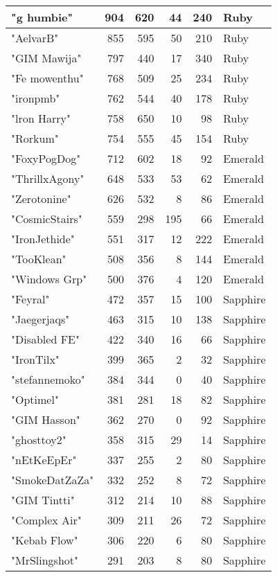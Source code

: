 \documentclass{article}
\begin{document}
\begin{table}[htbp]
\begin{tabular}{|l|r|r|r|r|l|}
"g humbie" & 904 & 620 & 44 & 240 & Ruby \\ \hline
"AelvarB" & 855 & 595 & 50 & 210 & Ruby \\ \hline
"GIM Mawija" & 797 & 440 & 17 & 340 & Ruby \\ \hline
"Fe mowenthu" & 768 & 509 & 25 & 234 & Ruby \\ \hline
"ironpmb" & 762 & 544 & 40 & 178 & Ruby \\ \hline
"lron Harry" & 758 & 650 & 10 & 98 & Ruby \\ \hline
"Rorkum" & 754 & 555 & 45 & 154 & Ruby \\ \hline
"FoxyPogDog" & 712 & 602 & 18 & 92 & Emerald \\ \hline
"ThrillxAgony" & 648 & 533 & 53 & 62 & Emerald \\ \hline
"Zerotonine" & 626 & 532 & 8 & 86 & Emerald \\ \hline
"CosmicStairs" & 559 & 298 & 195 & 66 & Emerald \\ \hline
"IronJethide" & 551 & 317 & 12 & 222 & Emerald \\ \hline
"TooKlean" & 508 & 356 & 8 & 144 & Emerald \\ \hline
"Windows Grp" & 500 & 376 & 4 & 120 & Emerald \\ \hline
"Feyral" & 472 & 357 & 15 & 100 & Sapphire \\ \hline
"Jaegerjaqs" & 463 & 315 & 10 & 138 & Sapphire \\ \hline
"Disabled FE" & 422 & 340 & 16 & 66 & Sapphire \\ \hline
"IronTilx" & 399 & 365 & 2 & 32 & Sapphire \\ \hline
"stefannemoko" & 384 & 344 & 0 & 40 & Sapphire \\ \hline
"Optimel" & 381 & 281 & 18 & 82 & Sapphire \\ \hline
"GIM Hasson" & 362 & 270 & 0 & 92 & Sapphire \\ \hline
"ghosttoy2" & 358 & 315 & 29 & 14 & Sapphire \\ \hline
"nEtKeEpEr" & 337 & 255 & 2 & 80 & Sapphire \\ \hline
"SmokeDatZaZa" & 332 & 252 & 8 & 72 & Sapphire \\ \hline
"GIM Tintti" & 312 & 214 & 10 & 88 & Sapphire \\ \hline
"Complex Air" & 309 & 211 & 26 & 72 & Sapphire \\ \hline
"Kebab Flow" & 306 & 220 & 6 & 80 & Sapphire \\ \hline
"MrSlingshot" & 291 & 203 & 8 & 80 & Sapphire \\ \hline

\end{tabular}
\end{table}
\end{document}
